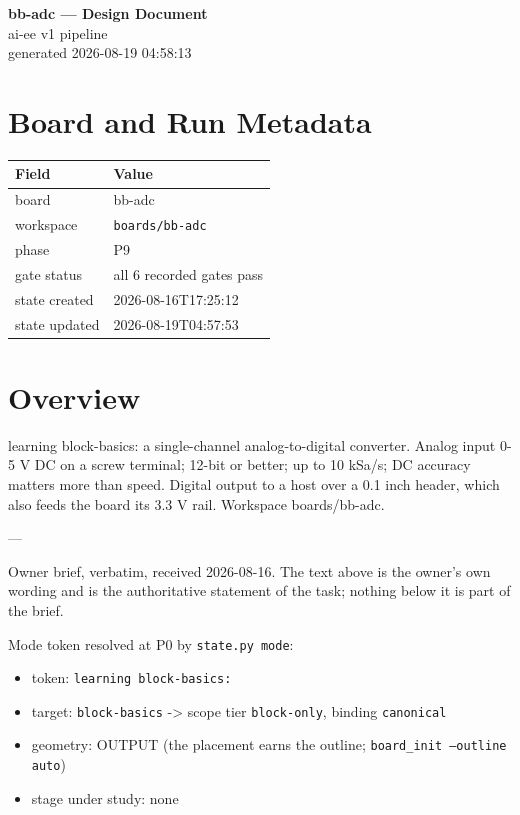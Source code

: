 \documentclass[11pt,a4paper]{article}
\begin{document}
\sloppy
\begin{center}
{\LARGE\bfseries bb-adc --- Design Document}\\[6pt]
{\large ai-ee v1 pipeline}\\[2pt]
generated 2026-08-19 04:58:13
\end{center}
\tableofcontents

\section{Board and Run Metadata}
{\small
\begin{longtable}{lp{11cm}}
\toprule
\textbf{Field} & \textbf{Value} \\
\midrule
\endhead
board & bb-adc \\
workspace & \texttt{boards/bb-adc} \\
phase & P9 \\
gate status & all 6 recorded gates pass \\
state created & 2026-08-16T17:25:12 \\
state updated & 2026-08-19T04:57:53 \\
\bottomrule
\end{longtable}
}
\section{Overview}
learning block-basics: a single-channel analog-to-digital converter. Analog input 0-5 V DC on a screw terminal; 12-bit or better; up to 10 kSa/s; DC accuracy matters more than speed. Digital output to a host over a 0.1 inch header, which also feeds the board its 3.3 V rail. Workspace boards/bb-adc.

---

Owner brief, verbatim, received 2026-08-16. The text above is the owner's own wording and is the authoritative statement of the task; nothing below it is part of the brief.

Mode token resolved at P0 by \texttt{state.py mode}:

\begin{itemize}
\item token: \texttt{learning block-basics:}
\item target: \texttt{block-basics} -\textgreater{} scope tier \texttt{block-only}, binding \texttt{canonical}
\item geometry: OUTPUT (the placement earns the outline; \texttt{board\_init --outline auto})
\item stage under study: none
\end{itemize}
\end{document}
